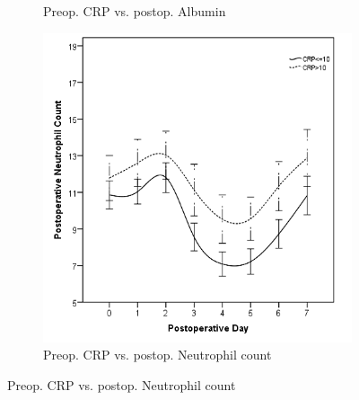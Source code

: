 \begin{figure}[p]
\begin{subfigure}{0.48\textwidth}
		\caption{Preop. CRP vs. postop. Albumin}
		\label{fig:sirs_crp_alb}
	\end{subfigure}
	
	\vspace{1cm}
	
	\begin{subfigure}{0.48\textwidth}
		\centering
		\includegraphics[width=\textwidth]{Figures/sirs_crp_neut}
		\caption{Preop. CRP vs. postop. Neutrophil count}
		\label{fig:sirs_crp_neut}
	\end{subfigure}	
\end{figure}


